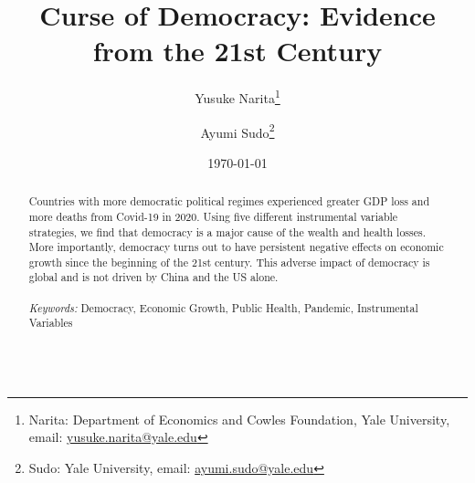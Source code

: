 \documentclass[8pt]{article}
\renewcommand{\thesubsection}{\Alph{subsection}}
\begin{document}
\begin{titlepage}
\title{Curse of Democracy: Evidence from the 21st Century}
\author{Yusuke Narita\thanks{Narita: Department of Economics and Cowles Foundation, Yale University, email: \url{yusuke.narita@yale.edu}} \and Ayumi Sudo\thanks{Sudo: Yale University, email: \url{ayumi.sudo@yale.edu}}}
\date{\today}
\maketitle

\begin{abstract}
\noindent 
Countries with more democratic political regimes experienced greater GDP loss and more deaths from Covid-19 in 2020. Using five different instrumental variable strategies, we find that democracy is a major cause of the wealth and health losses. More importantly, democracy turns out to have persistent negative effects on economic growth since the beginning of the 21st century. This adverse impact of democracy is global and is not driven by China and the US alone.\\
\vspace{0in}\\
\noindent\textit{Keywords:} Democracy, Economic Growth, Public Health, Pandemic, Instrumental Variables\\
\vspace{0in}\\

\bigskip
\end{abstract}

\setcounter{page}{0}
\thispagestyle{empty}
\end{titlepage}



\newpage
\appendix
\setcounter{table}{0}
\renewcommand{\thetable}{\thesubsection\arabic{table}}
\setcounter{figure}{0}
\renewcommand{\thefigure}{\thesubsection\arabic{figure}}

\end{document}
